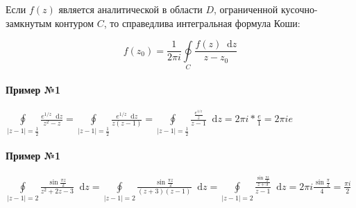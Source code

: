 \documentclass{article}
\newcommand*\diff{\mathop{}\!\mathrm{d}}
\begin{document}
Если $f(z)$ является аналитической в области $D$, ограниченной кусочно-замкнутым контуром $C$, то справедлива интегральная формула Коши:

$$
f(z_0) = \frac{1}{2 \pi i} \oint\limits_{C} \frac{f(z) \diff z}{z - z_0} 
$$

\paragraph{Пример №1}

$\oint\limits_{|z - 1| = \frac{1}{2}} \frac{e^{1/z} \diff z}{z^2 - z} = \oint\limits_{|z - 1| = \frac{1}{2}} \frac{e^{1/z} \diff z}{z (z - 1)} = \oint\limits_{|z - 1| = \frac{1}{2}} \frac{\frac{e^{1/z}}{z}}{z - 1} \diff z = 2 \pi i * \frac{e}{1} = 2 \pi i e$

\paragraph{Пример №1}

$\oint\limits_{|z - 1| = 2} \frac{\sin \frac{\pi z}{2}}{z^2 + 2 z - 3} \diff z = \oint\limits_{|z - 1| = 2} \frac{\sin \frac{\pi z}{2}}{(z + 3)(z - 1)} \diff z = \oint\limits_{|z - 1| = 2} \frac{\frac{\sin \frac{\pi z}{2}}{z + 3}}{z - 1} \diff z = 2 \pi i \frac{\sin \frac{\pi}{2}}{4} = \frac{\pi i}{2}$
\end{document}
